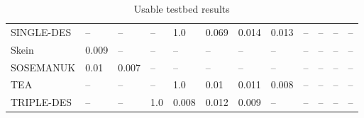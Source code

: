 \documentclass[twoside,a4paper]{article}
\begin{document}
\begin{table}[H]
\begin{tabular}{l|l l l l l l l l l l l}
SINGLE-DES   & \fd{}--    & \fd{}--    & \fd{}--    & \fd{}1.0   & \fd{}0.069 & \fn{}0.014 & \fn{}0.013 & \fn{}--    & \fn{}--    & \fn{}--    & \fn{}--   \\
Skein        & \fn{}0.009 & \fn{}--    & \fn{}--    & \fn{}--    & \fn{}--    & \fn{}--    & \fn{}--    & \fn{}--    & \fn{}--    & \fn{}--    & \fn{}--   \\
SOSEMANUK    & \fn{}0.01  & \fn{}0.007 & \fn{}--    & \fn{}--    & \fn{}--    & \fn{}--    & \fn{}--    & \fn{}--    & \fn{}--    & \fn{}--    & \fn{}--   \\
TEA          & \fd{}--    & \fd{}--    & \fd{}--    & \fd{}1.0   & \fn{}0.01  & \fn{}0.011 & \fn{}0.008 & \fn{}--    & \fn{}--    & \fn{}--    & \fn{}--   \\
TRIPLE-DES   & \fd{}--    & \fd{}--    & \fd{}1.0   & \fn{}0.008 & \fn{}0.012 & \fn{}0.009 & \fn{}--    & \fn{}--    & \fn{}--    & \fn{}--    & \fn{}--   
\end{tabular}
\caption{Usable testbed results}
\end{table}
\end{document}
